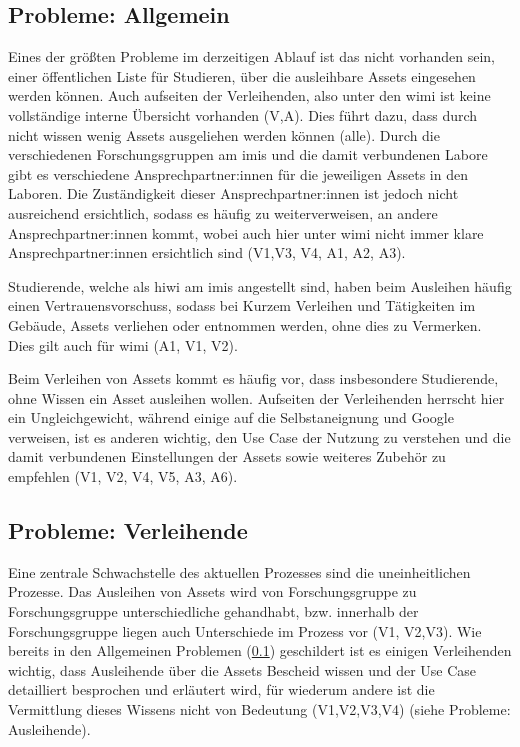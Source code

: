 \subsection{Probleme: Allgemein}
\label{section:probleme-allgemein}
Eines der größten Probleme im derzeitigen Ablauf ist das nicht vorhanden sein, einer öffentlichen
Liste für Studieren, über die ausleihbare Assets eingesehen werden können. Auch aufseiten der
Verleihenden, also unter den \ac{wimi} ist keine vollständige interne Übersicht vorhanden (V,A).
Dies führt dazu, dass durch nicht wissen wenig Assets ausgeliehen werden können (alle). Durch die
verschiedenen Forschungsgruppen am \ac{imis} und die damit verbundenen Labore gibt es verschiedene
Ansprechpartner:innen für die jeweiligen Assets in den Laboren. Die Zuständigkeit dieser
Ansprechpartner:innen ist jedoch nicht ausreichend ersichtlich, sodass es häufig zu weiterverweisen,
an andere Ansprechpartner:innen kommt, wobei auch hier unter \ac{wimi} nicht immer klare
Ansprechpartner:innen ersichtlich sind (V1,V3, V4, A1, A2, A3). 

Studierende, welche als \ac{hiwi} am \ac{imis} angestellt sind, haben beim Ausleihen häufig einen
Vertrauensvorschuss, sodass bei Kurzem Verleihen und Tätigkeiten im Gebäude, Assets verliehen oder
entnommen werden, ohne dies zu Vermerken. Dies gilt auch für \ac{wimi} (A1, V1, V2).

Beim Verleihen von Assets kommt es häufig vor, dass insbesondere Studierende, ohne Wissen ein Asset
ausleihen wollen. Aufseiten der Verleihenden herrscht hier ein Ungleichgewicht, während einige auf
die Selbstaneignung und Google verweisen, ist es anderen wichtig, den Use Case der Nutzung zu
verstehen und die damit verbundenen Einstellungen der Assets sowie weiteres Zubehör zu empfehlen
(V1, V2, V4, V5, A3, A6). 


\subsection{Probleme: Verleihende}
Eine zentrale Schwachstelle des aktuellen Prozesses sind die uneinheitlichen Prozesse. Das Ausleihen
von Assets wird von Forschungsgruppe zu Forschungsgruppe unterschiedliche gehandhabt, bzw. innerhalb
der Forschungsgruppe liegen auch Unterschiede im Prozess vor (V1, V2,V3). Wie bereits in den
Allgemeinen Problemen (\ref{section:probleme-allgemein}) geschildert ist es einigen Verleihenden
wichtig, dass Ausleihende über die Assets Bescheid wissen und der Use Case detailliert besprochen
und erläutert wird, für wiederum andere ist die Vermittlung dieses Wissens nicht von Bedeutung
(V1,V2,V3,V4) (siehe Probleme: Ausleihende).

